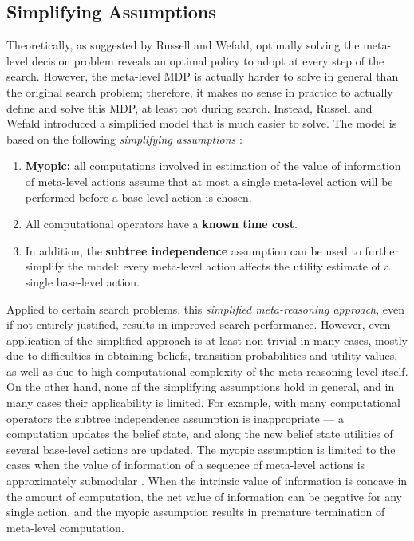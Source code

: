 \subsection{Simplifying Assumptions}

Theoretically, as suggested by Russell and Wefald, optimally solving
the meta-level decision problem reveals an optimal policy to adopt at
every step of the search. However, the meta-level MDP is actually
harder to solve in general than the original search problem;
therefore, it makes no sense in practice to actually define and solve 
this MDP, at least not during search. Instead, Russell and Wefald
introduced a simplified model that is much easier to solve. The model
is based on the following \emph{simplifying
assumptions} \cite{Russell.right}: 
\begin{enumerate}
\item \textbf{Myopic:} all computations involved in estimation of the
value of information of meta-level actions assume that at most a single
meta-level action will be performed before a base-level action is
chosen. 
\item All computational operators have a \textbf{known time cost}.
\item In addition, the \textbf{subtree independence} assumption can
be used to further simplify the model: every meta-level action
affects the utility estimate of a single base-level action. 
\end{enumerate}
Applied to certain search problems, this \emph{simplified
meta-reasoning approach}, even if not entirely justified, results in
improved search performance. However, even application of the
simplified approach is at least non-trivial in many cases, mostly due
to difficulties in obtaining beliefs, transition probabilities and
utility values, as well as due to high computational complexity of the
meta-reasoning level itself. On the other hand, none of the simplifying
assumptions hold in general, and in many cases their applicability is
limited. For example, with many computational operators the subtree
independence assumption is inappropriate --- a computation updates
the belief state, and along the new belief state utilities of several
base-level actions are updated. The myopic assumption is limited to
the cases when the value of information of a sequence of meta-level
actions is approximately submodular \cite{Guestrin.submodular}. When 
the intrinsic value of information is concave in the amount of
computation, the net value of information can be negative for any
single action, and the myopic assumption results in premature
termination of meta-level computation. 
